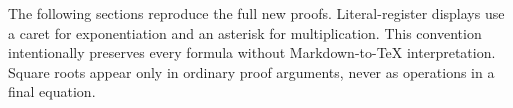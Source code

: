 The following sections reproduce the full new proofs. Literal-register displays use a caret for exponentiation and an asterisk for multiplication. This convention intentionally preserves every formula without Markdown-to-TeX interpretation. Square roots appear only in ordinary proof arguments, never as operations in a final equation.
